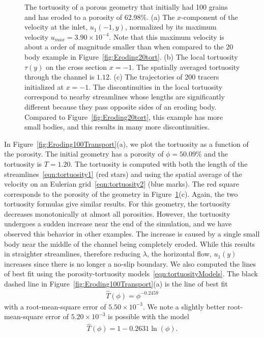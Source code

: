 \documentclass[preprint,10pt]{elsarticle}
\begin{document}
\begin{figure}[H]
\begin{subfigure}[b]{0.5\textwidth}
\caption{}
\end{subfigure}
\caption{\label{fig:Eroding100tort} The tortuosity of a porous geometry
that initially had 100 grains and has eroded to a porosity of 62.98\%.
(a) The $x$-component of the velocity at the inlet, $u_1(-1, y)$,
normalized by its maximum velocity $u_{max}=3.90 \times 10^{-4}$.  Note
that this maximum velocity is about a order of magnitude smaller than
when compared to the 20 body example in Figure~\ref{fig:Eroding20tort}.
(b) The local tortuosity $\tau(y)$ on the cross section $x = -1$. The
spatially averaged tortuosity through the channel is $1.12$. (c) The
trajectories of 200 tracers initialized at $x = -1$.  The
discontinuities in the local tortuosity correspond to nearby streamlines
whose lengths are significantly different because they pass opposite
sides of an eroding body. Compared to Figure~\ref{fig:Eroding20tort},
this example has more small bodies, and this results in many more
discontinuities.}
\end{figure}

In Figure~\ref{fig:Eroding100Transport}(a), we plot the tortuosity as a
function of the porosity.  The initial geometry has a porosity of $\phi
= 50.09\%$ and the tortuosity is $T = 1.20$.  The tortuosity is computed
with both the length of the streamlines~\eqref{eqn:tortuosity1} (red
stars) and using the spatial average of the velocity on an Eulerian
grid~\eqref{eqn:tortuosity2} (blue marks).  The red square corresponds
to the porosity of the geometry in Figure~\ref{fig:Eroding100tort}(c).
Again, the two tortuosity formulas give similar results.  For this
geometry, the tortuosity decreases monotonically at almost all
porosities.  However, the tortuosity undergoes a sudden increase near
the end of the simulation, and we have observed this behavior in other
examples.  The increase is caused by a single small body near the middle
of the channel being completely eroded.  While this results in
straighter streamlines, therefore reducing $\lambda$, the horizontal
flow, $u_1(y)$ increases since there is no longer a no-slip boundary.
We also computed the lines of best fit using the porosity-tortuosity
models~\eqref{eqn:tortuosityModels}.  The black dashed line in
Figure~\ref{fig:Eroding100Transport}(a) is the line of best fit
\begin{align}
  \widehat{T}(\phi) = \phi^{-0.2459}
\end{align}
with a root-mean-square error of $5.50 \times 10^{-3}$.  We note a
slightly better root-mean-square error of $5.20 \times 10^{-3}$ is
possible with the model
\begin{align}
  \widehat{T}(\phi) = 1 - 0.2631 \ln(\phi).
\end{align}
\end{document}
